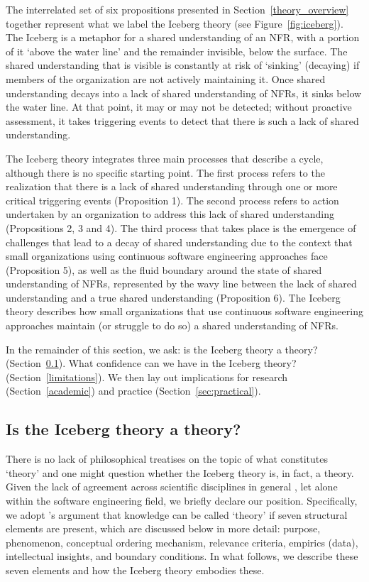 \documentclass[smallextended]{svjour3}        %
\begin{document}
The interrelated set of six propositions presented in Section~\ref{theory_overview} together represent what we label the Iceberg theory (see Figure~\ref{fig:iceberg}). 
The Iceberg is a metaphor \citep{stol2024theorizing} for a shared understanding of an NFR, with a portion of it `above the water line' and the remainder invisible, below the surface.
The shared understanding that is visible is constantly at risk of `sinking' (decaying) if members of the organization are not actively maintaining it. Once shared understanding decays into a lack of shared understanding of NFRs, it sinks below the water line. At that point, it may or may not be detected; without proactive assessment, it takes triggering events to detect that there is such a lack of shared understanding. 

The Iceberg theory integrates three main processes that describe a cycle, although there is no specific starting point. 
The first process refers to the realization that there is a lack of shared understanding through one or more critical triggering events (Proposition 1). 
The second process refers to action undertaken by an organization to address this lack of shared understanding (Propositions 2, 3 and 4). 
The third process that takes place is the emergence of challenges that lead to a decay of shared understanding due to the context that small organizations using continuous software engineering approaches face (Proposition 5), as well as the fluid boundary around the state of shared understanding of NFRs, represented by the wavy line between the lack of shared understanding and a true shared understanding (Proposition 6).
The Iceberg theory describes how small organizations that use continuous software engineering approaches maintain (or struggle to do so) a shared understanding of NFRs. 

In the remainder of this section, we ask: is the Iceberg theory a theory? (Section~\ref{sec:sandberg}). What confidence can we have in the Iceberg theory? (Section~\ref{limitations}). We then lay out implications for research (Section~\ref{academic}) and practice (Section~\ref{sec:practical}). 


\subsection{Is the Iceberg theory a theory?}
\label{sec:sandberg}

There is no lack of philosophical treatises on the topic of what constitutes `theory' and one might question whether the Iceberg theory is, in fact, a theory. Given the lack of agreement across scientific disciplines in general \citep{sandberg2021meanings,stol2024theorizing,mintzberg2017developing}, let alone within the software engineering field, we briefly declare our position. 
Specifically, we adopt \cite{sandberg2021meanings}'s argument that knowledge can be called `theory' if seven structural elements are present, which are discussed below in more detail: purpose, phenomenon, conceptual ordering mechanism, relevance criteria, empirics (data), intellectual insights, and boundary conditions. In what follows, we describe these seven elements and how the Iceberg theory embodies these.
\end{document}
